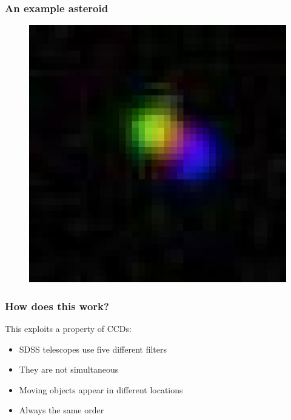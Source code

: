 \documentclass{beamer}
\begin{document}
\begin{frame}
    \frametitle{An example asteroid}
    \begin{figure}
        \centering
        \includegraphics[height=0.8\paperheight]{18364_large.jpg}
    \end{figure}
\end{frame}

\begin{frame}
    \frametitle{How does this work?}
    This exploits a property of CCDs:
    \begin{itemize}
        \item SDSS telescopes use five different filters
        \item They are not simultaneous
        \item Moving objects appear in different locations
        \item Always the same order
    \end{itemize}
\end{frame}
\end{document}
